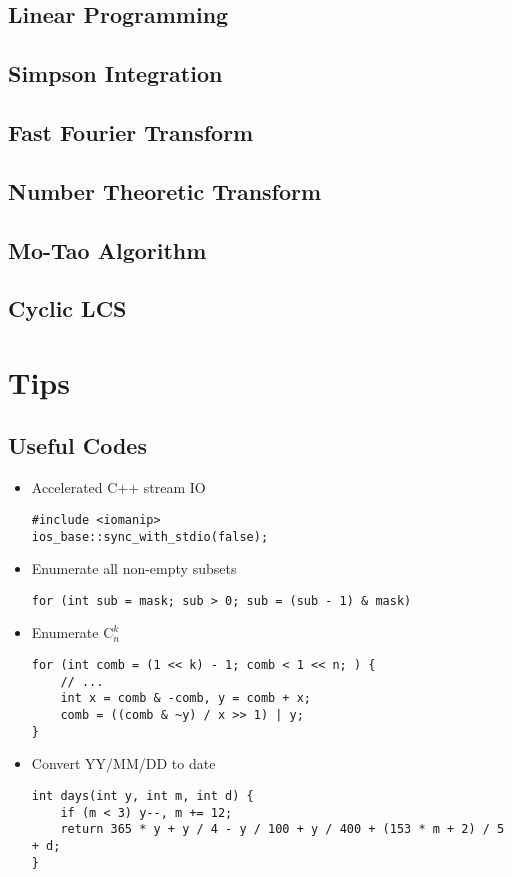 \documentclass[10pt]{article}
\begin{document}
{\subsection{Linear Programming}

\subsection{Simpson Integration}

\subsection{Fast Fourier Transform}

\subsection{Number Theoretic Transform}

\subsection{Mo-Tao Algorithm}

\subsection{Cyclic LCS}

\section{Tips}
\subsection{Useful Codes}
\begin{itemize}
\item Accelerated C++ stream IO
\begin{lstlisting}[frame=none]
#include <iomanip>
ios_base::sync_with_stdio(false);
\end{lstlisting}
\item Enumerate all non-empty subsets
\begin{lstlisting}[frame=none]
for (int sub = mask; sub > 0; sub = (sub - 1) & mask)
\end{lstlisting}
\item Enumerate $\mathrm{C}_{n}^{k}$
\begin{lstlisting}[frame=none]
for (int comb = (1 << k) - 1; comb < 1 << n; ) {
	// ...
	int x = comb & -comb, y = comb + x;
	comb = ((comb & ~y) / x >> 1) | y;
}
\end{lstlisting}
\item Convert YY/MM/DD to date
\begin{lstlisting}[frame=none]
int days(int y, int m, int d) {
	if (m < 3) y--, m += 12;
	return 365 * y + y / 4 - y / 100 + y / 400 + (153 * m + 2) / 5 + d;
}
\end{lstlisting}
\end{itemize}
}
\end{document}
